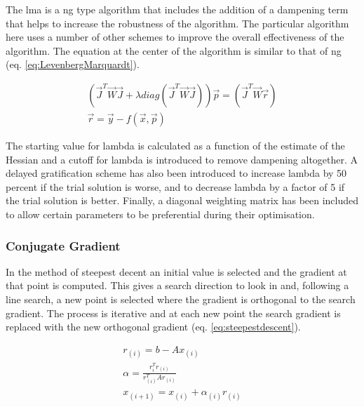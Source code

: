The \acrshort{lma}  is a \acrshort{ng} type algorithm that includes the addition of a dampening term that helps to increase the robustness of the algorithm.  The particular algorithm here uses a number of other schemes to improve the overall effectiveness of the algorithm.  The equation at the center of the algorithm is similar to that of \acrshort{ng} (eq. \ref{eq:LevenbergMarquardt}).

\begin{equation}
  \begin{split}
    \left( \vec{J}^{T} \vec{W} \vec{J} + \lambda diag\left( \vec{J}^{T} \vec{W} \vec{J} \right) \right) \vec{p} = {\left(\vec{J}^{T} \vec{W} \vec{r} \right)} \\
    \vec{r} = \vec{y} - f(\vec{x}, \vec{p})
  \end{split}
  \label{eq:LevenbergMarquardt}
\end{equation}

The starting value for lambda is calculated as a function of the estimate of the Hessian and a cutoff for lambda is introduced to remove dampening altogether.  A delayed gratification scheme has also been introduced to increase lambda by 50 percent if the trial solution is worse, and to decrease lambda by a factor of 5 if the trial solution is better. Finally, a diagonal weighting matrix has been included to allow certain parameters to be preferential during their optimisation.




\subsubsection{Conjugate Gradient}

In the method of steepest decent an initial value is selected and the gradient at that point is computed.  This gives a search direction to look in and, following a line search, a new point is selected where the gradient is orthogonal to the search gradient.  The process is iterative and at each new point the search gradient is replaced with the new orthogonal gradient (eq. \ref{eq:steepestdescent}\cite{conjugategradient}).

\begin{equation}
  \begin{split}
    r_{(i)} = b - A x_{(i)} \\
    \alpha = \frac{r^{T}_{i} r_{(i)}}{r_{(i)}^{T} A r_{(i)}} \\
    x_{(i+1)} = x_{(i)} + \alpha_{(i)} r_{(i)}
  \end{split}
  \label{eq:steepestdescent}
\end{equation}

